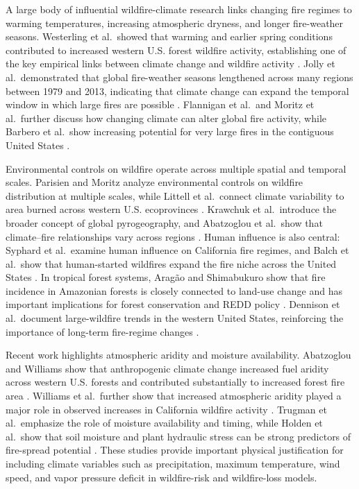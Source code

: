 A large body of influential wildfire-climate research links changing fire regimes to warming temperatures, increasing atmospheric dryness, and longer fire-weather seasons. Westerling et al.\ showed that warming and earlier spring conditions contributed to increased western U.S. forest wildfire activity, establishing one of the key empirical links between climate change and wildfire activity \citep{westerling2006warming}. Jolly et al.\ demonstrated that global fire-weather seasons lengthened across many regions between 1979 and 2013, indicating that climate change can expand the temporal window in which large fires are possible \citep{jolly2015climate}. Flannigan et al.\ and Moritz et al.\ further discuss how changing climate can alter global fire activity, while Barbero et al.\ show increasing potential for very large fires in the contiguous United States \citep{flannigan2009climate,moritz2012climate,barbero2015climate}.

Environmental controls on wildfire operate across multiple spatial and temporal scales. Parisien and Moritz analyze environmental controls on wildfire distribution at multiple scales, while Littell et al.\ connect climate variability to area burned across western U.S. ecoprovinces \citep{parisien2009environmental,littell2009climate}. Krawchuk et al.\ introduce the broader concept of global pyrogeography, and Abatzoglou et al.\ show that climate--fire relationships vary across regions \citep{krawchuk2009global,abatzoglou2018global}. Human influence is also central: Syphard et al.\ examine human influence on California fire regimes, and Balch et al.\ show that human-started wildfires expand the fire niche across the United States \citep{syphard2007human,balch2017human}. In tropical forest systems, Arag{\~a}o and Shimabukuro show that fire incidence in Amazonian forests is closely connected to land-use change and has important implications for forest conservation and REDD policy \citep{aragao2010incidence}. Dennison et al.\ document large-wildfire trends in the western United States, reinforcing the importance of long-term fire-regime changes \citep{dennison2014large}.

Recent work highlights atmospheric aridity and moisture availability. Abatzoglou and Williams show that anthropogenic climate change increased fuel aridity across western U.S. forests and contributed substantially to increased forest fire area \citep{abatzoglou2016anthropogenic}. Williams et al.\ further show that increased atmospheric aridity played a major role in observed increases in California wildfire activity \citep{williams2019observed}. Trugman et al.\ emphasize the role of moisture availability and timing, while Holden et al.\ show that soil moisture and plant hydraulic stress can be strong predictors of fire-spread potential \citep{trugman2018flash,holden2025soilmoisture}. These studies provide important physical justification for including climate variables such as precipitation, maximum temperature, wind speed, and vapor pressure deficit in wildfire-risk and wildfire-loss models.

